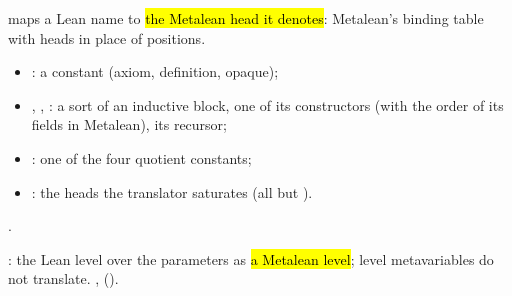 \begin{definition}
  \label{def:EraseProof-MBinding}
  \leanok
    maps a Lean name to
  \hl{the Metalean head it denotes}: Metalean's binding table with heads in place of positions.
  \begin{itemize}
  \item {}: a constant (axiom, definition, opaque);
  \item {}, , : a sort of an inductive block, one of its
        constructors (with the order of its fields in Metalean), its recursor;
  \item {}: one of the four quotient constants;
  \item {}: the heads the translator saturates (all but ).
  \end{itemize}
   .
\end{definition}

\begin{definition}
  \label{def:EraseProof-TrLevel}
  \leanok
   : the Lean level  over the parameters 
  as \hl{a Metalean level}; level metavariables do not translate.
   , 
  ().
\end{definition}

